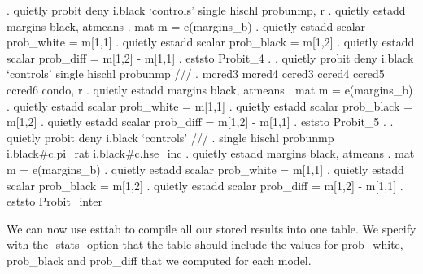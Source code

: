 \documentclass{scrartcl}
\begin{document}
\begin{SinputC}
. quietly probit deny i.black `controls' single hischl probunmp, r
. quietly estadd margins black, atmeans
. mat m = e(margins_b)
. quietly estadd scalar prob_white = m[1,1]
. quietly estadd scalar prob_black = m[1,2]
. quietly estadd scalar prob_diff = m[1,2] - m[1,1]
. eststo Probit_4
. 
. quietly probit deny i.black `controls' single hischl probunmp ///
.  mcred3 mcred4 ccred3 ccred4 ccred5 ccred6 condo, r
. quietly estadd margins black, atmeans
. mat m = e(margins_b)
. quietly estadd scalar prob_white = m[1,1]
. quietly estadd scalar prob_black = m[1,2]
. quietly estadd scalar prob_diff = m[1,2] - m[1,1]
. eststo Probit_5
. 
. quietly probit deny i.black `controls' ///
.  single hischl probunmp i.black#c.pi_rat i.black#c.hse_inc
. quietly estadd margins black, atmeans
. mat m = e(margins_b)
. quietly estadd scalar prob_white = m[1,1]
. quietly estadd scalar prob_black = m[1,2]
. quietly estadd scalar prob_diff = m[1,2] - m[1,1]
. eststo Probit_inter
\end{SinputC}

We can now use esttab to compile all our stored results into one table. We specify with the -stats- option that the table should include the values for prob\_white, prob\_black and prob\_diff that we computed for each model.
\end{document}
